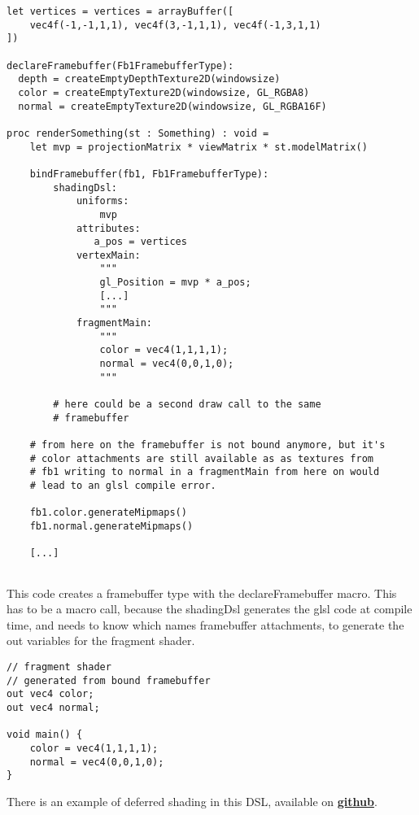 \documentclass[10pt]{report}
\begin{document}
\begin{verbatim}
let vertices = vertices = arrayBuffer([
    vec4f(-1,-1,1,1), vec4f(3,-1,1,1), vec4f(-1,3,1,1)
])

declareFramebuffer(Fb1FramebufferType):
  depth = createEmptyDepthTexture2D(windowsize)
  color = createEmptyTexture2D(windowsize, GL_RGBA8)
  normal = createEmptyTexture2D(windowsize, GL_RGBA16F)

proc renderSomething(st : Something) : void =
    let mvp = projectionMatrix * viewMatrix * st.modelMatrix()
    
    bindFramebuffer(fb1, Fb1FramebufferType):
        shadingDsl:
            uniforms:
                mvp
            attributes:
               a_pos = vertices
            vertexMain:
                """
                gl_Position = mvp * a_pos;
                [...]
                """
            fragmentMain:
                """
                color = vec4(1,1,1,1);
                normal = vec4(0,0,1,0);
                """
        
        # here could be a second draw call to the same
        # framebuffer
    
    # from here on the framebuffer is not bound anymore, but it's
    # color attachments are still available as as textures from
    # fb1 writing to normal in a fragmentMain from here on would
    # lead to an glsl compile error.
    
    fb1.color.generateMipmaps()
    fb1.normal.generateMipmaps()
    
    [...]
    
\end{verbatim}

This code creates a framebuffer type with the declareFramebuffer macro. This has to be a macro call, because the shadingDsl generates the glsl code at compile time, and needs to know which names framebuffer attachments, to generate the out variables for the fragment shader.

\begin{verbatim}
// fragment shader
// generated from bound framebuffer
out vec4 color;    
out vec4 normal;

void main() {
    color = vec4(1,1,1,1);
    normal = vec4(0,0,1,0);
}
\end{verbatim}

There is an example of deferred shading in this DSL, available on \href{https://github.com/krux02/opengl-sandbox/blob/master/examples/deferred_shading.nim}{\textbf{github}}.

{}

\end{document}
